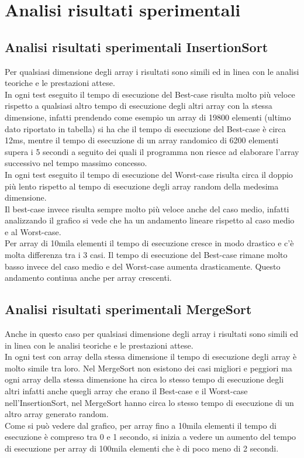 \documentclass[12pt]{article}
\begin{document}
\section{Analisi risultati sperimentali}
\subsection{Analisi risultati sperimentali InsertionSort} 
Per qualsiasi dimensione degli array i risultati sono simili ed in linea con le analisi teoriche e le prestazioni attese.
\\In ogni test eseguito il tempo di esecuzione del Best-case risulta molto più veloce rispetto a qualsiasi altro tempo di esecuzione degli altri array con la stessa dimensione, infatti prendendo come esempio un array di 19800 elementi (ultimo dato riportato in tabella) si ha che il tempo di esecuzione del Best-case è circa 12ms, mentre il tempo di esecuzione di un array randomico di 6200 elementi supera i 5 secondi a seguito dei quali il programma non riesce ad elaborare l'array successivo nel tempo massimo concesso.
\\In ogni test eseguito il tempo di esecuzione del Worst-case risulta circa il doppio più lento rispetto al tempo di esecuzione degli array random della medesima dimensione. 
\\Il best-case invece risulta sempre molto più veloce anche del caso medio, infatti analizzando il grafico si vede che ha un andamento lineare rispetto al caso medio e al Worst-case. 
\\Per array di 10mila elementi il tempo di esecuzione cresce in modo drastico e c'è molta differenza tra i 3 casi. Il tempo di esecuzione del Best-case rimane molto basso invece del caso medio e del Worst-case aumenta drasticamente. Questo andamento continua anche per array crescenti.
\subsection{Analisi risultati sperimentali MergeSort}
Anche in questo caso per qualsiasi dimensione degli array i risultati sono simili ed in linea con le analisi teoriche e le prestazioni attese.
\\In ogni test con array della stessa dimensione il tempo di esecuzione degli array è molto simile tra loro. 
Nel MergeSort non esistono dei casi migliori e peggiori ma ogni array della stessa dimensione ha circa lo stesso tempo di esecuzione degli altri infatti anche quegli array che erano il Best-case e il Worst-case nell'InsertionSort, nel MergeSort hanno circa lo stesso tempo di esecuzione di un altro array generato random. 
\\Come si può vedere dal grafico, per array fino a 10mila elementi il tempo di esecuzione è compreso tra 0 e 1 secondo, si inizia a vedere un aumento del tempo di esecuzione per array di 100mila elementi che è di poco meno di 2 secondi.
\end{document}
